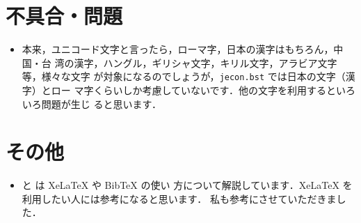 \documentclass{ltjsarticle}
\begin{document}


\section{不具合・問題}

\begin{itemize}
 \item 本来，ユニコード文字と言ったら，ローマ字，日本の漢字はもちろん，中国・台
       湾の漢字，ハングル，ギリシャ文字，キリル文字，アラビア文字等，様々な文字
       が対象になるのでしょうが，\texttt{jecon.bst} では日本の文字（漢字）とロー
       マ字くらいしか考慮していないです．他の文字を利用するといろいろ問題が生じ
       ると思います．
\end{itemize}


\section{その他}

\begin{itemize}
 \item \citet{120005614155} と \citet{120005678435} は XeLaTeX や BibTeX の使い
       方について解説しています．XeLaTeX を利用したい人には参考になると思います．
       私も参考にさせていただきました．
\end{itemize}

\vspace*{2em}

\nocite{*}



%

\end{document}
